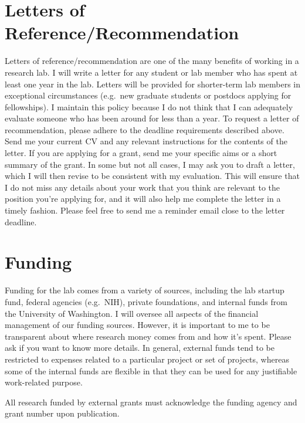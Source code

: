 \documentclass[
]{book}
\begin{document}
\hypertarget{letters-of-referencerecommendation}{%
\section{Letters of Reference/Recommendation}\label{letters-of-referencerecommendation}}

Letters of reference/recommendation are one of the many benefits of working in a research lab. I will write a letter for any student or lab member who has spent at least one year in the lab. Letters will be provided for shorter-term lab members in exceptional circumstances (e.g.~new graduate students or postdocs applying for fellowships). I maintain this policy because I do not think that I can adequately evaluate someone who has been around for less than a year.
To request a letter of recommendation, please adhere to the deadline requirements described above. Send me your current CV and any relevant instructions for the contents of the letter. If you are applying for a grant, send me your specific aims or a short summary of the grant. In some but not all cases, I may ask you to draft a letter, which I will then revise to be consistent with my evaluation. This will ensure that I do not miss any details about your work that you think are relevant to the position you're applying for, and it will also help me complete the letter in a timely fashion. Please feel free to send me a reminder email close to the letter deadline.

\hypertarget{funding}{%
\section{Funding}\label{funding}}

Funding for the lab comes from a variety of sources, including the lab startup fund, federal agencies (e.g.~NIH), private foundations, and internal funds from the University of Washington. I will oversee all aspects of the financial management of our funding sources. However, it is important to me to be transparent about where research money comes from and how it's spent. Please ask if you want to know more details. In general, external funds tend to be restricted to expenses related to a particular project or set of projects, whereas some of the internal funds are flexible in that they can be used for any justifiable work-related purpose.

All research funded by external grants must acknowledge the funding agency and grant number upon publication.
\end{document}
